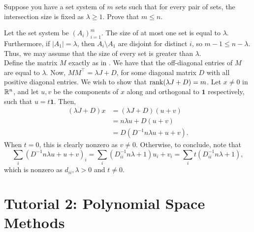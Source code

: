 \documentclass{article}
\begin{document}
	\begin{exercise}
		Suppose you have a set system of $m$ sets such that for every pair of sets, the intersection size is fixed as $\lambda \ge 1$. Prove that $m \le n$.
	\end{exercise}
	\begin{solution*}
		Let the set system be $(A_{i})_{i=1}^m$. The size of at most one set is equal to $\lambda$. Furthermore, if $|A_1| = \lambda$, then $A_i \setminus A_1$ are disjoint for distinct $i$, so $m-1 \le n-\lambda$. Thus, we may assume that the size of every set is greater than $\lambda$.\\
		Define the matrix $M$ exactly as in . We have that the off-diagonal entries of $M$ are equal to $\lambda$. Now, $MM^\top = \lambda J + D$, for some diagonal matrix $D$ with all positive diagonal entries. We wish to show that $\operatorname{rank}(\lambda J + D) = m$. Let $x \ne 0$ in $\mathbb{R}^n$, and let $u,v$ be the components of $x$ along and orthogonal to $\mathbf{1}$ respectively, such that $u = t\mathbf{1}$. Then,
		\begin{align*}
			(\lambda J + D)x &= (\lambda J + D)(u+v) \\
				&= n\lambda u + D(u+v) \\
				&= D (D^{-1}n\lambda u + u+v).
		\end{align*}
		When $t = 0$, this is clearly nonzero as $v \ne 0$. Otherwise, to conclude, note that
		\[ \sum_i (D^{-1}n\lambda u + u + v)_i = \sum_i (D_{ii}^{-1} n \lambda + 1) u_i + v_i = \sum_i t(D_{ii}^{-1}n\lambda + 1),  \]
		which is nonzero as $d_{ii},\lambda > 0$ and $t \ne 0$.
	\end{solution*}

\section{Tutorial 2: Polynomial Space Methods}
\end{document}
